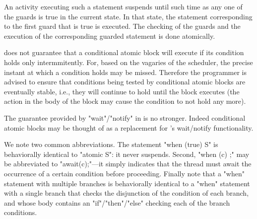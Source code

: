 {An activity executing such a statement suspends until such time as any
one of the guards is true in the current state. In that state, the
statement corresponding to the first guard that is true is executed.
The checking of the guards and the execution of the corresponding
guarded statement is done atomically. 


\Xten{} does not guarantee that a conditional atomic block
will execute if its condition holds only intermmitently. For, based on
the vagaries of the scheduler, the precise instant at which a
condition holds may be missed. Therefore the programmer is advised to
ensure that conditions being tested by conditional atomic blocks are
eventually stable, i.e., they will continue to hold until the block
executes (the action in the body of the block may cause the condition
to not hold any more).


\begin{rationale}
The guarantee provided by \xcd"wait"/\xcd"notify" in \java{} is no
stronger. Indeed conditional atomic blocks may be thought of as a
replacement for \java's wait/notify functionality.
\end{rationale} 

We note two common abbreviations. The statement \xcd"when (true) S" is
behaviorally identical to \xcd"atomic S": it never suspends. Second,
\xcd"when (c) {;}" may be abbreviated to \xcd"await(c);"---it
simply indicates that the thread must await the occurrence of a
certain condition before proceeding.  Finally note that a \xcd"when"
statement with multiple branches is behaviorally identical to a
\xcd"when" statement with a single branch that checks the disjunction of
the condition of each branch, and whose body contains an
\xcd"if"/\xcd"then"/\xcd"else" checking each of the branch conditions.

}
